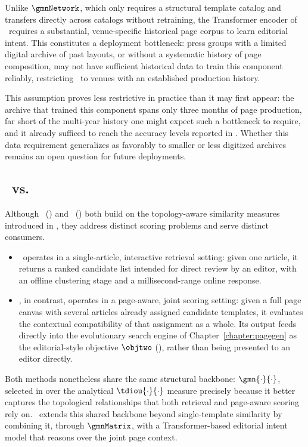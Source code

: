 Unlike $\gmnNetwork$, which only requires a structural template catalog and transfers directly across catalogs without retraining, the Transformer encoder of \neuralmethod\ requires a substantial, venue-specific historical page corpus to learn editorial intent. This constitutes a deployment bottleneck: press groups with a limited digital archive of past layouts, or without a systematic history of page composition, may not have sufficient historical data to train this component reliably, restricting \neuralmethod\ to venues with an established production history.

This assumption proves less restrictive in practice than it may first appear: the \laprovence archive that trained this component spans only three months of page production, far short of the multi-year history one might expect such a bottleneck to require, and it already sufficed to reach the accuracy levels reported in . Whether this data requirement generalizes as favorably to smaller or less digitized archives remains an open question for future deployments.

\subsection*{ \trs\ vs. \neuralmethod}

Although \trs\ () and \neuralmethod\ () both build on the topology-aware similarity measures introduced in , they address distinct scoring problems and serve distinct consumers.
\begin{itemize}
    \item \trs\ operates in a single-article, interactive retrieval setting: given one article, it returns a ranked candidate list intended for direct review by an editor, with an offline clustering stage and a millisecond-range online response.
    \item \neuralmethod, in contrast, operates in a page-aware, joint scoring setting: given a full page canvas with several articles already assigned candidate templates, it evaluates the contextual compatibility of that assignment as a whole. Its output feeds directly into the evolutionary search engine of Chapter~\ref{chapter:pagegen} as the editorial-style objective $\objtwo$ (), rather than being presented to an editor directly.
\end{itemize}
Both methods nonetheless share the same structural backbone: $\gmn{\cdot}{\cdot}$, selected in  over the analytical $\tdiou{\cdot}{\cdot}$ measure precisely because it better captures the topological relationships that both retrieval and page-aware scoring rely on. \neuralmethod\ extends this shared backbone beyond single-template similarity by combining it, through $\gmnMatrix$, with a Transformer-based editorial intent model that reasons over the joint page context.

